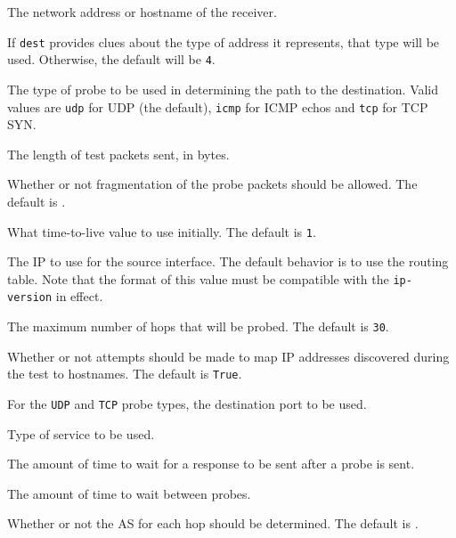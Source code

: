 \documentclass[10pt]{article}
\begin{document}
 The network address or hostname of the receiver.

 If {\tt dest} provides clues about the type of
address it represents, that type will be used.  Otherwise, the default
will be {\tt 4}.

 The type of probe to be used in
determining the path to the destination.  Valid values are {\tt udp}
for UDP (the default), {\tt icmp} for ICMP echos and {\tt tcp} for TCP
SYN.

 The length of test packets sent, in
bytes.

 Whether or not fragmentation of the
probe packets should be allowed.  The default is \false.

 What time-to-live value to use
initially.  The default is {\tt 1}.




 The IP to use for the source interface.  The
default behavior is to use the routing table.  Note that the format of
this value must be compatible with the {\tt ip-version} in effect.

 The maximum number of hops that will be
probed.  The default is {\tt 30}.

 Whether or not attempts should be made
to map IP addresses discovered during the test to hostnames.  The
default is {\tt True}.

 For the {\tt UDP} and {\tt TCP} probe
types, the destination port to be used.

 Type of service to be used.  

 The amount of time to wait for a response
to be sent after a probe is sent.



 The amount of time to wait between
probes.

 Whether or not the AS for each hop should be
determined.  The default is \false.
\end{document}
